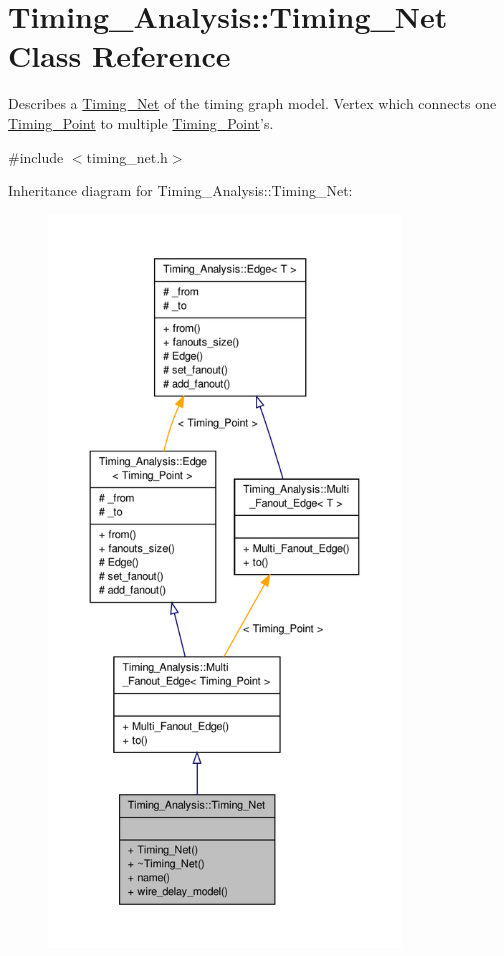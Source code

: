 \hypertarget{classTiming__Analysis_1_1Timing__Net}{\section{Timing\-\_\-\-Analysis\-:\-:Timing\-\_\-\-Net Class Reference}
\label{classTiming__Analysis_1_1Timing__Net}
}


Describes a \hyperlink{classTiming__Analysis_1_1Timing__Net}{Timing\-\_\-\-Net} of the timing graph model. Vertex which connects one \hyperlink{classTiming__Analysis_1_1Timing__Point}{Timing\-\_\-\-Point} to multiple \hyperlink{classTiming__Analysis_1_1Timing__Point}{Timing\-\_\-\-Point}'s.  




{\ttfamily \#include $<$timing\-\_\-net.\-h$>$}



Inheritance diagram for Timing\-\_\-\-Analysis\-:\-:Timing\-\_\-\-Net\-:\nopagebreak
\begin{figure}[H]
\begin{center}
\leavevmode
\includegraphics[height=550pt]{classTiming__Analysis_1_1Timing__Net__inherit__graph}
\end{center}
\end{figure}


